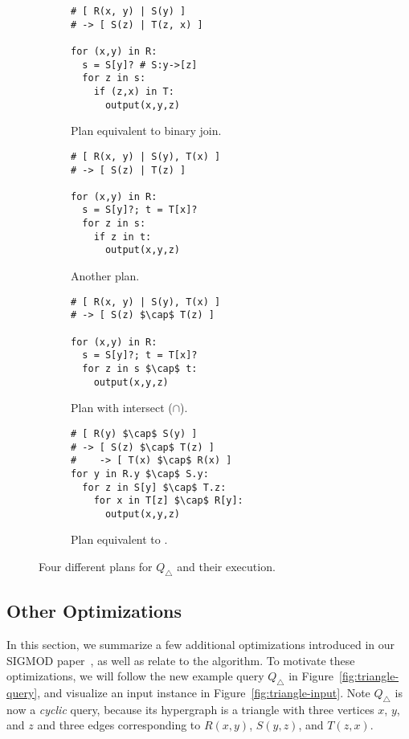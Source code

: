 \begin{figure*}
  \begin{subfigure}[t]{0.23\linewidth}
    \begin{lstlisting}
# [ R(x, y) | S(y) ]
# -> [ S(z) | T(z, x) ]

for (x,y) in R:
  s = S[y]? # S:y->[z]
  for z in s:
    if (z,x) in T:
      output(x,y,z)
\end{lstlisting}
    \caption{Plan equivalent to binary join.}
    \label{fig:bj-triangle}
  \end{subfigure}
  \begin{subfigure}[t]{0.25\linewidth}
    \begin{lstlisting}[numbers=none, showlines=true]
# [ R(x, y) | S(y), T(x) ]
# -> [ S(z) | T(z) ]

for (x,y) in R:
  s = S[y]?; t = T[x]?
  for z in s:
    if z in t:
      output(x,y,z)
\end{lstlisting}
    \caption{Another \FJ plan.}
    \label{fig:fj-triangle}
  \end{subfigure}
  \begin{subfigure}[t]{0.25\linewidth}
    \begin{lstlisting}[showlines=true]
# [ R(x, y) | S(y), T(x) ]
# -> [ S(z) $\cap$ T(z) ]

for (x,y) in R:
  s = S[y]?; t = T[x]?
  for z in s $\cap$ t:
    output(x,y,z)

\end{lstlisting}
    \caption{Plan with intersect ($\cap$).}
    \label{fig:inter-triangle}
  \end{subfigure}
  \begin{subfigure}[t]{0.25\linewidth}
    \begin{lstlisting}[showlines=true, numbers=none]
# [ R(y) $\cap$ S(y) ]
# -> [ S(z) $\cap$ T(z) ]
#    -> [ T(x) $\cap$ R(x) ]
for y in R.y $\cap$ S.y:
  for z in S[y] $\cap$ T.z:
    for x in T[z] $\cap$ R[y]:
      output(x,y,z)

\end{lstlisting}
    \caption{Plan equivalent to \GJ.}
    \label{fig:gj-triangle}
  \end{subfigure}
  \caption{Four different \FJ plans for $Q_\triangle$ and their execution.}
\end{figure*}

\subsection{Other Optimizations}\label{sec:other-optimizations}
In this section, we summarize a few additional optimizations
introduced in our SIGMOD paper~\cite{10.1145/3589295},
as well as relate \FJ to the \GJ algorithm.
To motivate these optimizations, we will follow the new example query
$Q_\triangle$ in Figure~\ref{fig:triangle-query},
and visualize an input instance in Figure~\ref{fig:triangle-input}.
Note $Q_\triangle$ is now a {\em cyclic} query, because its hypergraph
is a triangle with three vertices $x$, $y$, and $z$ and three edges
corresponding to $R(x, y)$, $S(y,z)$, and $T(z, x)$.

